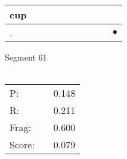 \documentclass[landscape]{article}
\newcommand{\ssp}{\hspace{2pt}}
\newcommand{\mex}{\cellcolor{g}$\bullet$}
\begin{document}
\begin{tabular}{|l|p{10pt}|p{10pt}|p{10pt}|p{10pt}|p{10pt}|p{10pt}|p{10pt}|p{10pt}|p{10pt}|}
\hline
\ssp cup \ssp&\hspace{2pt}&\hspace{2pt}&\hspace{2pt}&\hspace{2pt}&\hspace{2pt}&\hspace{2pt}&\hspace{2pt}&\hspace{2pt}&\hspace{2pt}\\
\hline
\ssp \cellcolor{ref8}. \ssp&\hspace{2pt}&\hspace{2pt}&\hspace{2pt}&\hspace{2pt}&\hspace{2pt}&\hspace{2pt}&\hspace{2pt}&\hspace{2pt}&\hspace{2pt}\mex\\
\hline
\end{tabular}

\vspace{6pt}
\noindent Segment 61\\\\
\noindent\begin{tabular}{lm{12pt}r}
\hline
P:&&0.148\\
R:&&0.211\\
Frag:&&0.600\\
Score:&&0.079\\
\end{tabular}

\newpage
\end{document}
